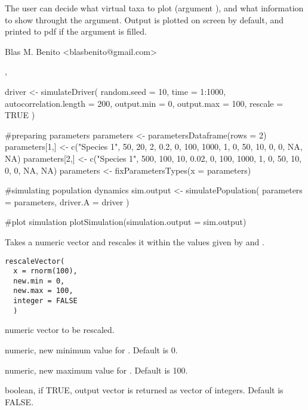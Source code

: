 \documentclass[letterpaper]{book}
\begin{document}
%
\begin{Details}\relax
The user can decide what virtual taxa to plot (argument ), and what information to show throught the  argument. Output is plotted on screen by default, and printed to pdf if the  argument is filled.
\end{Details}
%
\begin{Author}\relax
Blas M. Benito  <blasbenito@gmail.com>
\end{Author}
%
\begin{SeeAlso}\relax
{}, 
\end{SeeAlso}
%
\begin{Examples}
\begin{ExampleCode}

driver <- simulateDriver(
 random.seed = 10,
 time = 1:1000,
 autocorrelation.length = 200,
 output.min = 0,
 output.max = 100,
 rescale = TRUE
 )

#preparing parameters
parameters <- parametersDataframe(rows = 2)
parameters[1,] <- c("Species 1", 50, 20, 2, 0.2, 0, 100, 1000, 1, 0, 50, 10, 0, 0, NA, NA)
parameters[2,] <- c("Species 1", 500, 100, 10, 0.02, 0, 100, 1000, 1, 0, 50, 10, 0, 0, NA, NA)
parameters <- fixParametersTypes(x = parameters)

#simulating population dynamics
sim.output <- simulatePopulation(
 parameters = parameters,
 driver.A = driver
 )

#plot simulation
plotSimulation(simulation.output = sim.output)

\end{ExampleCode}
\end{Examples}
%
\begin{Description}\relax
Takes a numeric vector  and rescales it within the values given by  and .
\end{Description}
%
\begin{Usage}
\begin{verbatim}
rescaleVector(
  x = rnorm(100),
  new.min = 0,
  new.max = 100,
  integer = FALSE
  )
\end{verbatim}
\end{Usage}
%
\begin{Arguments}
\begin{ldescription}
\item[\code{x}] numeric vector to be rescaled.

\item[\code{new.min}] numeric, new minimum value for . Default is 0.

\item[\code{new.max}] numeric, new maximum value for . Default is 100.

\item[\code{integer}] boolean, if TRUE, output vector is returned as vector of integers. Default is FALSE.
\end{ldescription}
\end{Arguments}
\end{document}
